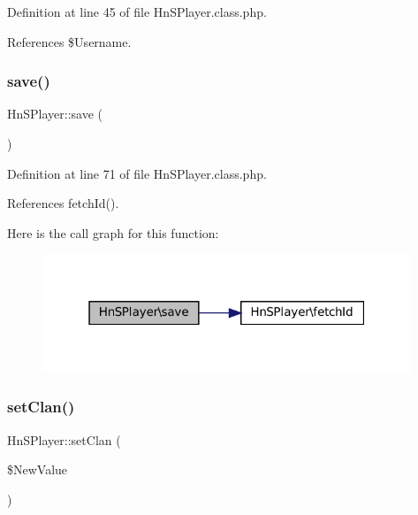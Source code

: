 Definition at line 45 of file Hn\+S\+Player.\+class.\+php.



References \$\+Username.

\mbox{\label{class_hn_s_player_a8179db6105a3e571a42fd3ba25e10542}} 
\subsubsection{\texorpdfstring{save()}{save()}}
{\footnotesize\ttfamily Hn\+S\+Player\+::save (\begin{DoxyParamCaption}{ }\end{DoxyParamCaption})}



Definition at line 71 of file Hn\+S\+Player.\+class.\+php.



References fetch\+Id().

Here is the call graph for this function\+:\nopagebreak
\begin{figure}[H]
\begin{center}
\leavevmode
\includegraphics[width=313pt]{class_hn_s_player_a8179db6105a3e571a42fd3ba25e10542_cgraph}
\end{center}
\end{figure}
\mbox{\label{class_hn_s_player_ab3a0cb11bac6bef00d1aff09e1d9ab9e}} 
\subsubsection{\texorpdfstring{set\+Clan()}{setClan()}}
{\footnotesize\ttfamily Hn\+S\+Player\+::set\+Clan (\begin{DoxyParamCaption}\item[{}]{\$\+New\+Value }\end{DoxyParamCaption})}



